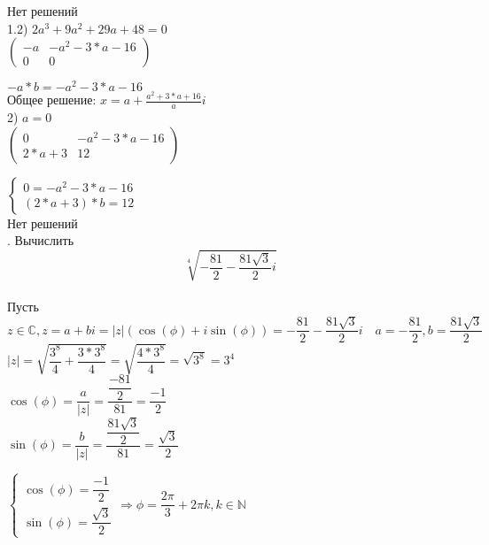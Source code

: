 \documentclass[12pt, a4paper]{article}
\begin{document}
	 Нет решений \\
	 
	 1.2) $2a^3 + 9a^2 + 29a + 48 = 0$ \\
	 
	 $\left(\begin{matrix}
	 	-a & -a^2-3*a-16 \\
	 	0 & 0
	 \end{matrix}\right)$ \sspace
	 
	 $
	 -a*b = -a^2-3*a-16
	 $
	 \\
	 
	 Общее решение: $x = a + \frac{a^2+3*a+16}{a}i$ \\
	 
	 2) $a = 0$ \\ 
	 
	 $\left(\begin{matrix}
	 	0 & -a^2-3*a-16 \\
	 	2*a+3 & 12
	 \end{matrix}\right)$ \sspace
	 
	 $\begin{cases}
	 		0 = -a^2-3*a-16 \\
	 		\left(2*a+3\right)*b = 12
	 	\end{cases}$ \\
	 	
	 Нет решений \\
	 
	  . Вычислить \\
	 
	 \[\sqrt[4]{-\dfrac{81}{2} - \dfrac{81\sqrt{3}}{2}i}\] \\
	 
	 Пусть $z \in \mathbb{C}, z = a + bi = |z|(\cos(\phi) + i\sin(\phi)) = -\dfrac{81}{2} - \dfrac{81\sqrt{3}}{2}i \quad a = -\dfrac{81}{2}, b = \dfrac{81\sqrt{3}}{2}$ \\ 
	 
	 $|z| = \sqrt{\dfrac{3^8}{4} + \dfrac{3 * 3^8}{4}} = \sqrt{\dfrac{4 * 3 ^ 8}{4}} = \sqrt{3^8} = 3^4$ \\
	 
	 $\cos(\phi) = \dfrac{a}{|z|} = \dfrac{\dfrac{-81}{2}}{81} = \dfrac{-1}{2}$ \\
	 
	 $\sin(\phi) = \dfrac{b}{|z|} = \dfrac{\dfrac{81\sqrt{3}}{2}}{81} = \dfrac{\sqrt{3}}{2}$ \sspace
	 
	 $\begin{cases} \cos(\phi) = \dfrac{-1}{2} \\ 
	 \sin(\phi) = \dfrac{\sqrt{3}}{2}
	 \end{cases} \Rightarrow \phi = \dfrac{2\pi}{3} + 2\pi k, k \in \mathbb{N}$ \sspace
	 
\end{document}
